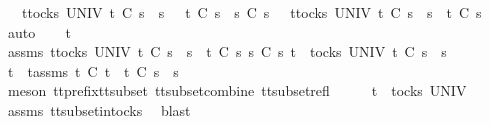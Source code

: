 \ \ {\isachardoublequoteopen}{\isasymforall}\ t{\isasymin}tocks\ UNIV{\isachardot}\ t\ {\isasymle}\isactrlsub C\ s{}\ {\isacharat}\ s{}\ \ {\isasymlongrightarrow}\ t\ {\isasymle}\isactrlsub C\ s{}\ {\isasymLongrightarrow}\ s{}\ {\isasymsubseteq}\isactrlsub C\ s{}{\isacharprime}\ {\isasymLongrightarrow}\ {\isasymforall}\ t{\isasymin}tocks\ UNIV{\isachardot}\ t\ {\isasymle}\isactrlsub C\ s{}\ {\isacharat}\ s{}{\isacharprime}\ {\isasymlongrightarrow}\ t\ {\isasymle}\isactrlsub C\ s{}{\isachardoublequoteclose}\isanewline
%
\isadelimproof
%
\endisadelimproof
%
\isatagproof
{}\isamarkupfalse%
\ auto\isanewline
\ \ \isamarkupfalse%
\ t\isanewline
\ \ \isamarkupfalse%
\ assms{\isacharcolon}\ {\isachardoublequoteopen}{\isasymforall}t{\isasymin}tocks\ UNIV{\isachardot}\ t\ {\isasymle}\isactrlsub C\ s{}\ {\isacharat}\ s{}\ {\isasymlongrightarrow}\ t\ {\isasymle}\isactrlsub C\ s{}{\isachardoublequoteclose}\ {\isachardoublequoteopen}s{}\ {\isasymsubseteq}\isactrlsub C\ s{}{\isacharprime}{\isachardoublequoteclose}\ {\isachardoublequoteopen}t\ {\isasymin}\ tocks\ UNIV{\isachardoublequoteclose}\ {\isachardoublequoteopen}t\ {\isasymle}\isactrlsub C\ s{}\ {\isacharat}\ s{}{\isacharprime}{\isachardoublequoteclose}\isanewline
\ \ \isamarkupfalse%
\ \isamarkupfalse%
\ t{\isacharprime}\ \ t{\isacharprime}{\isacharunderscore}assms{\isacharcolon}\ {\isachardoublequoteopen}t{\isacharprime}\ {\isasymsubseteq}\isactrlsub C\ t\ {\isasymand}\ t{\isacharprime}\ {\isasymle}\isactrlsub C\ s{}\ {\isacharat}\ s{}{\isachardoublequoteclose}\isanewline
\ \ \ \ \isamarkupfalse%
\ {\isacharparenleft}meson\ tt{\isacharunderscore}prefix{\isacharunderscore}tt{\isacharunderscore}subset\ tt{\isacharunderscore}subset{\isacharunderscore}combine\ tt{\isacharunderscore}subset{\isacharunderscore}refl{\isacharparenright}\isanewline
\ \ \isamarkupfalse%
\ \isamarkupfalse%
\ {\isachardoublequoteopen}t{\isacharprime}\ {\isasymin}\ tocks\ UNIV{\isachardoublequoteclose}\isanewline
\ \ \ \ \isamarkupfalse%
\ assms{\isacharparenleft}{}{\isacharparenright}\ tt{\isacharunderscore}subset{\isacharunderscore}in{\isacharunderscore}tocks\ \isamarkupfalse%
\ blast\isanewline
\ \ \isamarkupfalse%
\ \isamarkupfalse%
